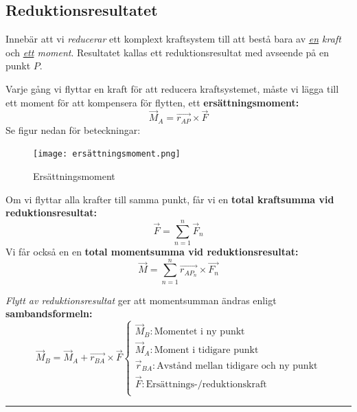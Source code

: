 \documentclass{article}
\newenvironment{ankiflashcard}[1]{}{}
\newcommand{\ruler}{
\rule{0.5\textwidth}{0.5pt}
}
\begin{document}
\begin{paracol}{2}
\begin{ankiflashcard}{Ange formeln och definitionen för reduktionsresultat.}
\subsection{Reduktionsresultatet}
Innebär att vi \textit{reducerar} ett komplext kraftsystem till att bestå bara av \textit{\underline{en} kraft} och \textit{\underline{ett} moment}. Resultatet kallas ett reduktionsresultat med avseende på en punkt $P$.
\end{ankiflashcard}

\begin{ankiflashcard}{Ange formeln för erättningsmoment}
Varje gång vi flyttar en kraft för att reducera kraftsystemet, måste vi lägga till ett moment för att  kompensera för flytten, ett \newline
\textbf{ersättningsmoment:}
$$
\vec M_A = \vec{r_{AP}} \times \vec F
$$
Se figur nedan för beteckningar:
\begin{figure}[H]
    \centering
    \texttt{[image: ersättningsmoment.png]}
    \caption{Ersättningsmoment}
\end{figure}
\end{ankiflashcard}

\begin{ankiflashcard}{Definera kraftsumma och momentsumma vid reduktionsresultat.}
Om vi flyttar alla krafter till samma punkt, får vi en \textbf{total kraftsumma vid reduktionsresultat:}
$$
\vec F = \overset{n}{\underset{n=1}{\sum}} \vec F_n
$$
Vi får också en en \textbf{total momentsumma vid reduktionsresultat:}
$$
\vec M = \overset{n}{\underset{n=1}{\sum}} \vec{r_{AP_n}} \times \vec{F_n}
$$

\end{ankiflashcard}


\begin{ankiflashcard}{Ange formeln för flytt av reduktionsresultat.}
    \textit{Flytt av reduktionsresultat} ger att momentsumman ändras enligt \textbf{sambandsformeln:}
$$
\vec M_B = \vec M_A + \vec{r_{BA}} \times \vec F\left\{\begin{array}{l}\vec M_B: \text{Momentet i ny punkt} \\\vec M_A: \text{Moment i tidigare punkt} \\\vec r_{BA}: \text{Avstånd mellan tidigare och ny punkt} \\\vec F: \text{Ersättnings-/reduktionskraft} \\\end{array}\right.$$
\end{ankiflashcard}
\ruler


\end{paracol}
\end{document}
